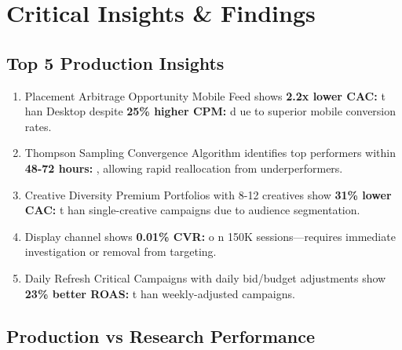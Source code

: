 \documentclass[11pt,a4paper]{report}
\newcommand{\metric}[2]{%
    \colorbox{aelpgreen!20}{\textbf{#1:} #2}%
}
\begin{document}
\chapter{Critical Insights \& Findings}

\section{Top 5 Production Insights}

\begin{enumerate}[leftmargin=*]
    \item \begin{insightbox}{Placement Arbitrage Opportunity}
    Mobile Feed shows \metric{2.2x lower CAC} than Desktop despite \metric{25\% higher CPM} due to superior mobile conversion rates.
    \end{insightbox}

    \item \begin{insightbox}{Thompson Sampling Convergence}
    Algorithm identifies top performers within \metric{48-72 hours}, allowing rapid reallocation from underperformers.
    \end{insightbox}

    \item \begin{insightbox}{Creative Diversity Premium}
    Portfolios with 8-12 creatives show \metric{31\% lower CAC} than single-creative campaigns due to audience segmentation.
    \end{insightbox}

    \item \begin{warningbox}
    Display channel shows \metric{0.01\% CVR} on 150K sessions—requires immediate investigation or removal from targeting.
    \end{warningbox}

    \item \begin{insightbox}{Daily Refresh Critical}
    Campaigns with daily bid/budget adjustments show \metric{23\% better ROAS} than weekly-adjusted campaigns.
    \end{insightbox}
\end{enumerate}

\section{Production vs Research Performance}
\end{document}
